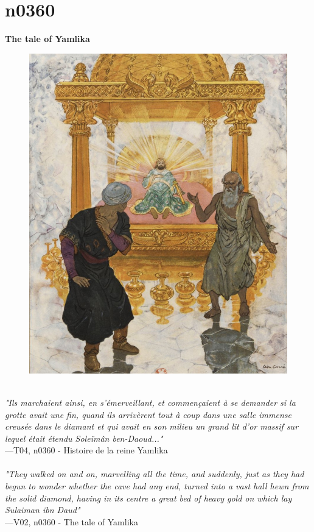 \documentclass[../Carre_nights.tex]{subfiles}
\begin{document}
\newpage

\section{n0360}
\textbf{\Large{The tale of Yamlika}} \\

\begin{figure}[ht]
\centering
\includegraphics[height=\figsize]{illustrations/volume_4/T04, n0360 - Histoire de la reine Yamlika.jpg}
\end{figure}

\textit{\\
"Ils marchaient ainsi, en s’émerveillant, et commençaient à se demander si la grotte avait une fin, quand ils arrivèrent tout à coup dans une salle immense creusée dans le diamant et qui avait en son milieu un grand lit d’or massif sur lequel était étendu Soleïmân ben-Daoud..."} \\
—T04, n0360 - Histoire de la reine Yamlika \\~\\
\textit{"They walked on and on, marvelling all the time, and suddenly, just as they had begun to wonder whether the cave had any end, turned into a vast hall hewn from the solid diamond, having in its centre a great bed of heavy gold on which lay Sulaiman ibn Daud"} \\
—V02, n0360 - The tale of Yamlika
\end{document}
